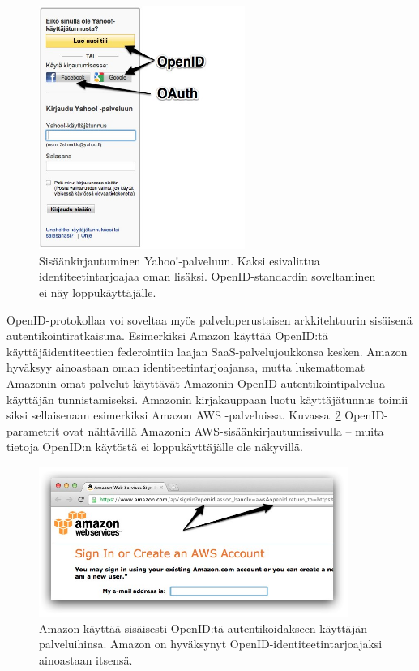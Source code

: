 \documentclass[finnish,gradu]{tktltiki}
\begin{document}
  \begin{figure}[h!]
    \centering
    \includegraphics[width=0.6\textwidth]{images/yahoo_login.jpg}
    \caption[Yahoo!-palvelun sisäänkirjautumissivu.]{Sisäänkirjautuminen Yahoo!-palveluun. Kaksi esivalittua identiteetintarjoajaa oman lisäksi. OpenID-standardin soveltaminen ei näy loppukäyttäjälle.}
    \label{fig:yahoo_login}
  \end{figure}

  OpenID-protokollaa voi soveltaa myös palveluperustaisen arkkitehtuurin sisäisenä autentikointiratkaisuna. Esimerkiksi Amazon käyttää OpenID:tä käyttäjäidentiteettien federointiin laajan SaaS-palvelujoukkonsa kesken. Amazon hyväksyy ainoastaan oman identiteetintarjoajansa, mutta lukemattomat Amazonin omat palvelut käyttävät Amazonin OpenID-autentikointipalvelua käyttäjän tunnistamiseksi. Amazonin kirjakauppaan luotu käyttäjätunnus toimii siksi sellaisenaan esimerkiksi Amazon AWS -palveluissa. Kuvassa~\ref{fig:amazon_openid} OpenID-parametrit ovat nähtävillä Amazonin AWS-sisäänkirjautumissivulla -- muita tietoja OpenID:n käytöstä ei loppukäyttäjälle ole näkyvillä.

  \begin{figure}
    \centering
    \includegraphics[width=0.9\textwidth]{images/amazon_openid.jpg}
    \caption[Amazon soveltaa OpenID:tä.]{Amazon käyttää sisäisesti OpenID:tä autentikoidakseen käyttäjän palveluihinsa. Amazon on hyväksynyt  OpenID-identiteetintarjoajaksi ainoastaan itsensä.}
    \label{fig:amazon_openid}
  \end{figure}
\end{document}
